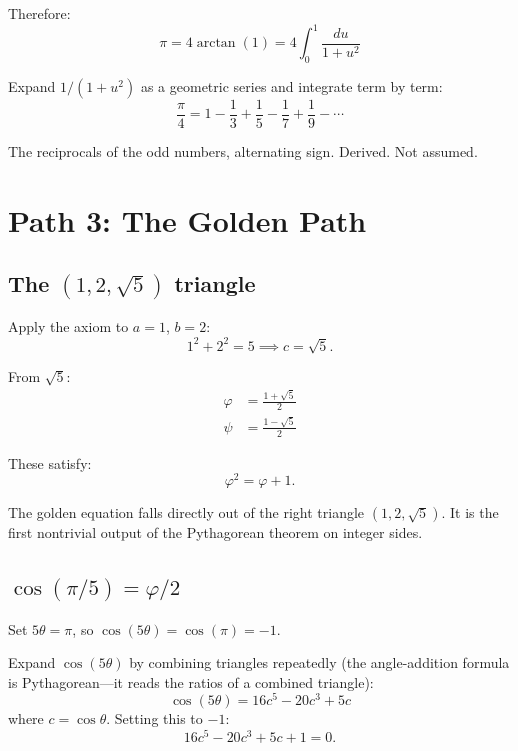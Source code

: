 \documentclass[11pt,a4paper]{article}
\theoremstyle{plain}
\theoremstyle{definition}
\newcommand{\vp}{\varphi}
\begin{document}
Therefore:
\begin{equation}\label{eq:pi-4arctan}
  \boxed{\; \pi = 4\arctan(1) = 4\int_0^1 \frac{du}{1 + u^2} \;}
\end{equation}

Expand $1/(1+u^2)$ as a geometric series and integrate term by term:
\begin{equation}\label{eq:leibniz}
  \frac{\pi}{4} = 1 - \frac{1}{3} + \frac{1}{5} - \frac{1}{7} + \frac{1}{9} - \cdots
\end{equation}

The reciprocals of the odd numbers, alternating sign. Derived. Not assumed.

\section{Path 3: The Golden Path}

\subsection{The $(1, 2, \sqrt{5})$ triangle}

Apply the axiom to $a = 1$, $b = 2$:
\begin{equation}
  1^2 + 2^2 = 5 \implies c = \sqrt{5}.
\end{equation}

From $\sqrt{5}$:
\begin{align}
  \vp &= \frac{1 + \sqrt{5}}{2} \\
  \psi &= \frac{1 - \sqrt{5}}{2}
\end{align}

These satisfy:
\begin{equation}\label{eq:golden}
  \vp^2 = \vp + 1.
\end{equation}

The golden equation falls directly out of the right triangle $(1, 2, \sqrt{5})$.
It is the first nontrivial output of the Pythagorean theorem on integer sides.

\subsection{$\cos(\pi/5) = \vp/2$}\label{sec:bridge}

Set $5\theta = \pi$, so $\cos(5\theta) = \cos(\pi) = -1$.

Expand $\cos(5\theta)$ by combining triangles repeatedly (the angle-addition
formula is Pythagorean---it reads the ratios of a combined triangle):
\begin{equation}
  \cos(5\theta) = 16c^5 - 20c^3 + 5c
\end{equation}
where $c = \cos\theta$. Setting this to $-1$:
\begin{equation}
  16c^5 - 20c^3 + 5c + 1 = 0.
\end{equation}
\end{document}
